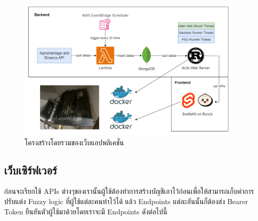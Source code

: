 \begin{figure}[h]
    \centering
    \includegraphics[width=0.95\textwidth]{images/webapp-overview.png}
    \caption{โครงสร้างโดยรวมของเว็บแอปพลิเคชั่น}
\end{figure}

\subsection{เว็บเซิร์ฟเวอร์}
ก่อนจะเรียกใช้ APIs ต่างๆของเรานั้นผู้ใช้ต้องทำการสร้างบัญชีเอาไว้ก่อนเพื่อให้สามารถเก็บค่าการปรับแต่ง Fuzzy logic ที่ผู้ใช้แต่ละคนทำไว้ได้ แล้ว Endpoints
แต่ละอันนั้นก็ต้องส่ง Bearer Token ยืนยันตัวผู้ใช้มาด้วยโดยเราจะมี Endpoints ดังต่อไปนี้

